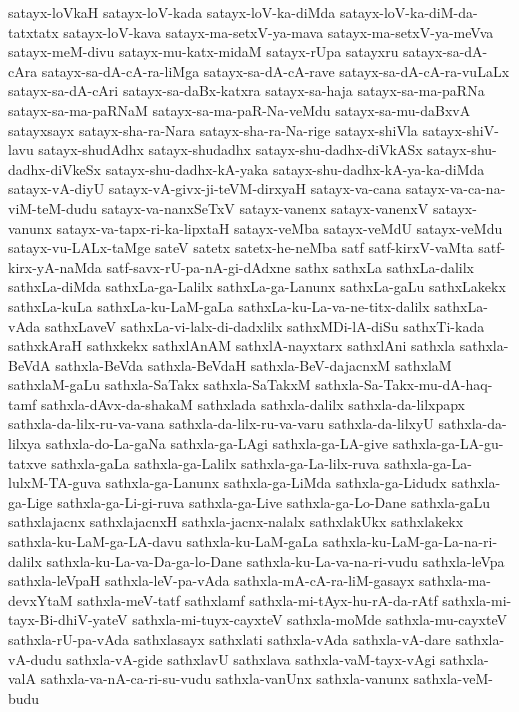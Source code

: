 {satayx-loVkaH
satayx-loV-kada
satayx-loV-ka-diMda
satayx-loV-ka-diM-da-tatxtatx
satayx-loV-kava
satayx-ma-setxV-ya-mava
satayx-ma-setxV-ya-meVva
satayx-meM-divu
satayx-mu-katx-midaM
satayx-rUpa
satayxru
satayx-sa-dA-cAra
satayx-sa-dA-cA-ra-liMga
satayx-sa-dA-cA-rave
satayx-sa-dA-cA-ra-vuLaLx
satayx-sa-dA-cAri
satayx-sa-daBx-katxra
satayx-sa-haja
satayx-sa-ma-paRNa
satayx-sa-ma-paRNaM
satayx-sa-ma-paR-Na-veMdu
satayx-sa-mu-daBxvA
satayxsayx
satayx-sha-ra-Nara
satayx-sha-ra-Na-rige
satayx-shiVla
satayx-shiV-lavu
satayx-shudAdhx
satayx-shudadhx
satayx-shu-dadhx-diVkASx
satayx-shu-dadhx-diVkeSx
satayx-shu-dadhx-kA-yaka
satayx-shu-dadhx-kA-ya-ka-diMda
satayx-vA-diyU
satayx-vA-givx-ji-teVM-dirxyaH
satayx-va-cana
satayx-va-ca-na-viM-teM-dudu
satayx-va-nanxSeTxV
satayx-vanenx
satayx-vanenxV
satayx-vanunx
satayx-va-tapx-ri-ka-lipxtaH
satayx-veMba
satayx-veMdU
satayx-veMdu
satayx-vu-LALx-taMge
sateV
satetx
satetx-he-neMba
satf
satf-kirxV-vaMta
satf-kirx-yA-naMda
satf-savx-rU-pa-nA-gi-dAdxne
sathx
sathxLa
sathxLa-dalilx
sathxLa-diMda
sathxLa-ga-Lalilx
sathxLa-ga-Lanunx
sathxLa-gaLu
sathxLakekx
sathxLa-kuLa
sathxLa-ku-LaM-gaLa
sathxLa-ku-La-va-ne-titx-dalilx
sathxLa-vAda
sathxLaveV
sathxLa-vi-lalx-di-dadxlilx
sathxMDi-lA-diSu
sathxTi-kada
sathxkAraH
sathxkekx
sathxlAnAM
sathxlA-nayxtarx
sathxlAni
sathxla
sathxla-BeVdA
sathxla-BeVda
sathxla-BeVdaH
sathxla-BeV-dajacnxM
sathxlaM
sathxlaM-gaLu
sathxla-SaTakx
sathxla-SaTakxM
sathxla-Sa-Takx-mu-dA-haq-tamf
sathxla-dAvx-da-shakaM
sathxlada
sathxla-dalilx
sathxla-da-lilxpapx
sathxla-da-lilx-ru-va-vana
sathxla-da-lilx-ru-va-varu
sathxla-da-lilxyU
sathxla-da-lilxya
sathxla-do-La-gaNa
sathxla-ga-LAgi
sathxla-ga-LA-give
sathxla-ga-LA-gu-tatxve
sathxla-gaLa
sathxla-ga-Lalilx
sathxla-ga-La-lilx-ruva
sathxla-ga-La-lulxM-TA-guva
sathxla-ga-Lanunx
sathxla-ga-LiMda
sathxla-ga-Lidudx
sathxla-ga-Lige
sathxla-ga-Li-gi-ruva
sathxla-ga-Live
sathxla-ga-Lo-Dane
sathxla-gaLu
sathxlajacnx
sathxlajacnxH
sathxla-jacnx-nalalx
sathxlakUkx
sathxlakekx
sathxla-ku-LaM-ga-LA-davu
sathxla-ku-LaM-gaLa
sathxla-ku-LaM-ga-La-na-ri-dalilx
sathxla-ku-La-va-Da-ga-lo-Dane
sathxla-ku-La-va-na-ri-vudu
sathxla-leVpa
sathxla-leVpaH
sathxla-leV-pa-vAda
sathxla-mA-cA-ra-liM-gasayx
sathxla-ma-devxYtaM
sathxla-meV-tatf
sathxlamf
sathxla-mi-tAyx-hu-rA-da-rAtf
sathxla-mi-tayx-Bi-dhiV-yateV
sathxla-mi-tuyx-cayxteV
sathxla-moMde
sathxla-mu-cayxteV
sathxla-rU-pa-vAda
sathxlasayx
sathxlati
sathxla-vAda
sathxla-vA-dare
sathxla-vA-dudu
sathxla-vA-gide
sathxlavU
sathxlava
sathxla-vaM-tayx-vAgi
sathxla-valA
sathxla-va-nA-ca-ri-su-vudu
sathxla-vanUnx
sathxla-vanunx
sathxla-veM-budu
}
